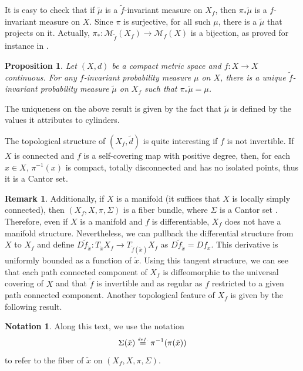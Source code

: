 \documentclass[a4paper,11pt,reqno]{amsart}
\newcommand{\eqdef}{\stackrel{\scriptscriptstyle\textrm def.}{=}}
\newtheorem{proposition}{Proposition}
\theoremstyle{definition}
\newtheorem{remark}{Remark}
\newtheorem*{notation}{Notation}
\begin{document}
It is easy to check that if $\tilde{\mu}$ is a $\tilde{f}$-invariant measure on $X_f$, then $\pi_*\tilde{\mu}$ is a $f$-invariant measure on $X$. Since $\pi$ is surjective, for all such $\mu$, there is a $\tilde{\mu}$ that projects on it. Actually, $\pi_*: \mathcal{M}_{\tilde{f}}(X_f) \to \mathcal{M}_f(X)$ is a bijection, as proved for instance in \cite[Proposition I.3.1]{QXZ2009}.

\begin{proposition}
    \label{prop:qxz-mu}
    Let $(X,d)$ be a compact metric space and $f: X \to X$ continuous. For any $f$-invariant probability measure $\mu$ on $X$, there is a unique $\tilde{f}$-invariant probability measure $\tilde{\mu}$ on $X_f$ such that $\pi_* \tilde{\mu} = \mu$.
\end{proposition}

The uniqueness on the above result is given by the fact that $\tilde{\mu}$ is defined by the values it attributes to cylinders. 

The topological structure of $(X_f, \tilde{d})$ is quite interesting if $f$ is not invertible. If $X$ is connected and $f$ is a self-covering map with positive degree, then, for each $x \in X$, $\pi^{-1}(x)$ is compact, totally disconnected and has no isolated points, thus it is a Cantor set.

\begin{remark}
Additionally, if $X$ is a manifold (it suffices that $X$ is locally simply connected), then $(X_f, X, \pi, \Sigma)$ is a fiber bundle, where $\Sigma$ is a Cantor set \cite[Theorem 6.5.1]{AH1994}. Therefore, even if $X$ is a manifold and $f$ is differentiable, $X_f$ does not have a manifold structure. Nevertheless, we can pullback the differential structure from $X$ to $X_f$ and define $D\tilde{f}_{\tilde{x}}: T_{\tilde{x}}X_f \to T_{\tilde{f}(\tilde{x})}X_f$ as $D\tilde{f}_{\tilde{x}} = Df_x$. This derivative is uniformly bounded as a function of $\tilde{x}$. Using this tangent structure, we can see that each path connected component of $X_f$ is diffeomorphic to the universal covering of $X$ and that $\tilde{f}$ is invertible and as regular as $f$ restricted to a given path connected component. Another topological feature of $X_f$ is given by the following result.
\end{remark}

\begin{notation}
	Along this text, we use the notation $$\Sigma(\tilde{x}) \eqdef \pi^{-1}(\pi(\tilde{x}))$$ to refer to the fiber of $\tilde{x}$ on $(X_f, X, \pi, \Sigma)$.
\end{notation}
\end{document}
